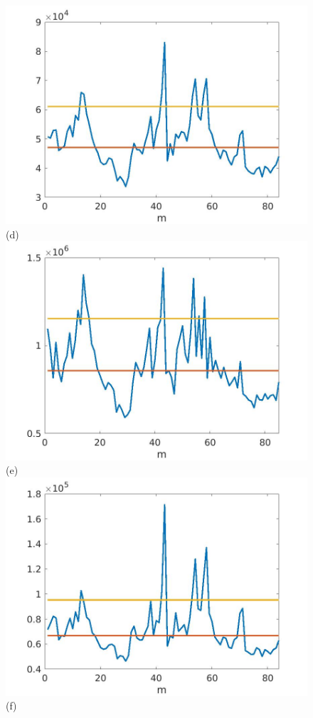 \documentclass[journal]{IEEEtran}
\begin{document}
\begin{figure}[htp!]
\includegraphics[scale=.12]{../../figs/consecdif_J2_VV_squared_meandev}(d)\\
\includegraphics[scale=.12]{../../figs/J3_VV_squared_meandev}(e)
\includegraphics[scale=.12]{../../figs/consecdif_J3_VV_squared_meandev}(f)\\

\end{figure}
\end{document}
